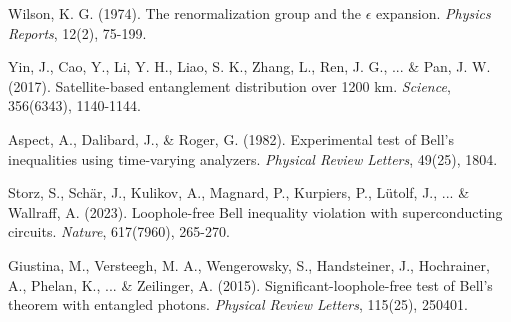 \documentclass[12pt]{article}
\begin{document}
\newpage
\begin{thebibliography}{99}

Wilson, K. G. (1974). The renormalization group and the $\epsilon$ expansion. \textit{Physics Reports}, 12(2), 75-199.

Yin, J., Cao, Y., Li, Y. H., Liao, S. K., Zhang, L., Ren, J. G., ... \& Pan, J. W. (2017). Satellite-based entanglement distribution over 1200 km. \textit{Science}, 356(6343), 1140-1144.

Aspect, A., Dalibard, J., \& Roger, G. (1982). Experimental test of Bell's inequalities using time-varying analyzers. \textit{Physical Review Letters}, 49(25), 1804.

Storz, S., Schär, J., Kulikov, A., Magnard, P., Kurpiers, P., Lütolf, J., ... \& Wallraff, A. (2023). Loophole-free Bell inequality violation with superconducting circuits. \textit{Nature}, 617(7960), 265-270.

Giustina, M., Versteegh, M. A., Wengerowsky, S., Handsteiner, J., Hochrainer, A., Phelan, K., ... \& Zeilinger, A. (2015). Significant-loophole-free test of Bell's theorem with entangled photons. \textit{Physical Review Letters}, 115(25), 250401.

\end{thebibliography}
\end{document}
